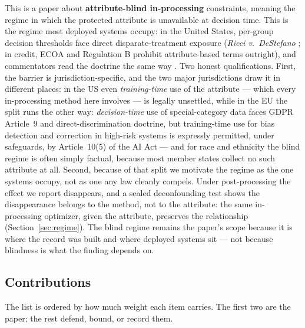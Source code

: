 \documentclass[9pt,conference]{IEEEtran}
\begin{document}
This is a paper about \textbf{attribute-blind in-processing} constraints, meaning the regime
in which the protected attribute is unavailable at decision time. This is the regime most
deployed systems occupy: in the United States, per-group decision thresholds face direct
disparate-treatment exposure (\emph{Ricci v.\ DeStefano} \cite{ricci2009}; in credit, ECOA
and Regulation B prohibit attribute-based terms outright), and commentators read the
doctrine the same way \cite{barocas2016,corbett2017}. Two honest qualifications. First,
the barrier is jurisdiction-specific, and the two major jurisdictions draw it in different
places: in the US even \emph{training-time} use of the attribute --- which every
in-processing method here involves --- is legally unsettled, while in the EU the split
runs the other way: \emph{decision-time} use of special-category data faces GDPR
Article~9 and direct-discrimination doctrine, but training-time use for bias detection
and correction in high-risk systems is expressly permitted, under safeguards, by
Article~10(5) of the AI Act --- and for race and ethnicity the blind regime is often
simply factual, because most member states collect no such attribute at all. Second,
because of that split we motivate the regime as the one systems occupy, not as one any
law cleanly compels. Under
post-processing the effect we report disappears, and a sealed deconfounding test shows
the disappearance belongs to the method, not to the attribute: the same in-processing
optimizer, given the attribute, preserves the relationship
(Section~\ref{sec:regime}). The blind regime remains the paper's scope because it is
where the record was built and where deployed systems sit --- not because blindness is
what the finding depends on.

\subsection{Contributions}

The list is ordered by how much weight each item carries. The first two are the paper; the
rest defend, bound, or record them.
\end{document}
